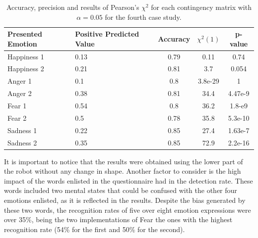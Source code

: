 \clearpage
\begin{table}[h]
\centering
\small
\caption{Accuracy, precision and results of Pearson's $\chi^2$ for each contingency matrix with $\alpha = 0.05$ for the fourth case study.} 
\label{table:Precision2}
		\begin{tabular}{|p{3 cm}|p{2 cm}|c|c|c|}
		\hline
		\textbf{Presented Emotion} & \textbf{Positive Predicted Value} & \textbf{Accuracy} & \textbf{$\chi^2(1)$} & \textbf{p-value}\\
		\hline
		Happiness 1 & 0.13 & 0.79 & 0.11 & 0.74\\
		\hline
		Happiness 2 & 0.21 & 0.81& 3.7 &0.054\\
		\hline
		Anger 1 & 0.1 & 0.8 & 3.8e-29 & 1\\
		\hline
		Anger 2 & 0.38 & 0.81 & 34.4 & 4.47e-9\\
		\hline
		Fear 1 & 0.54 & 0.8 & 36.2 & 1.8-e9\\
		\hline 
		Fear 2 & 0.5 & 0.78 & 35.8 & 5.3e-10\\
		\hline
		Sadness 1 & 0.22 & 0.85 & 27.4 & 1.63e-7\\
		\hline
		Sadness 2 & 0.35 & 0.85 & 72.9 & 2.2e-16\\		 
		\hline
			\end{tabular}
\end{table}
 
It is important to notice that the results were obtained using the lower part of the robot without any change in shape. Another factor to consider is the high impact of the words enlisted in the questionnaire had in the detection rate. These words included two mental states that could be confused with the other four emotions enlisted, as it is reflected in the results. Despite the bias generated by these two words, the recognition rates of five over eight emotion expressions were over 35\%, being the two implementations of Fear the ones with the highest recognition rate (54\% for the first and 50\% for the second).
